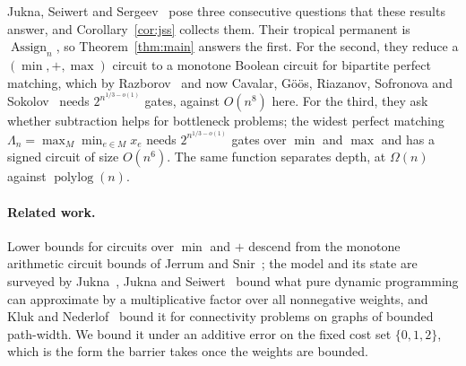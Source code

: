\documentclass[11pt]{article}
\newcommand{\Assign}{\operatorname{Assign}}
\begin{document}
Jukna, Seiwert and Sergeev~\cite{jukna-seiwert-sergeev20} pose three consecutive
questions that these results answer, and Corollary~\ref{cor:jss} collects them.
Their tropical permanent is $\Assign_n$, so Theorem~\ref{thm:main} answers the
first.  For the second, they reduce a $(\min,+,\max)$ circuit to a monotone
Boolean circuit for bipartite perfect matching, which by
Razborov~\cite{razborov85} and now Cavalar, G\"o\"os, Riazanov, Sofronova and
Sokolov~\cite{cgrss26} needs $2^{n^{1/3-o(1)}}$ gates, against $O(n^{8})$ here.
For the third, they ask whether subtraction helps for bottleneck problems; the
widest perfect matching $\Lambda_n=\max_M\min_{e\in M}x_e$ needs
$2^{n^{1/3-o(1)}}$ gates over $\min$ and $\max$ and has a signed circuit of size
$O(n^{6})$.  The same function separates depth, at $\Omega(n)$ against
$\operatorname{polylog}(n)$.

\paragraph{Related work.}
Lower bounds for circuits over $\min$ and $+$ descend from the monotone
arithmetic circuit bounds of Jerrum and Snir~\cite{jerrum-snir82}; the model and
its state are surveyed by Jukna~\cite{jukna15-tropical, jukna23-tropical}, Jukna
and Seiwert~\cite{jukna-seiwert20} bound what pure dynamic programming can
approximate by a multiplicative factor over all nonnegative weights, and Kluk
and Nederlof~\cite{kluk-nederlof26} bound it for connectivity problems on graphs
of bounded path-width.  We bound it under an additive error on the fixed cost set
$\{0,1,2\}$, which is the form the barrier takes once the weights are bounded.
\end{document}
